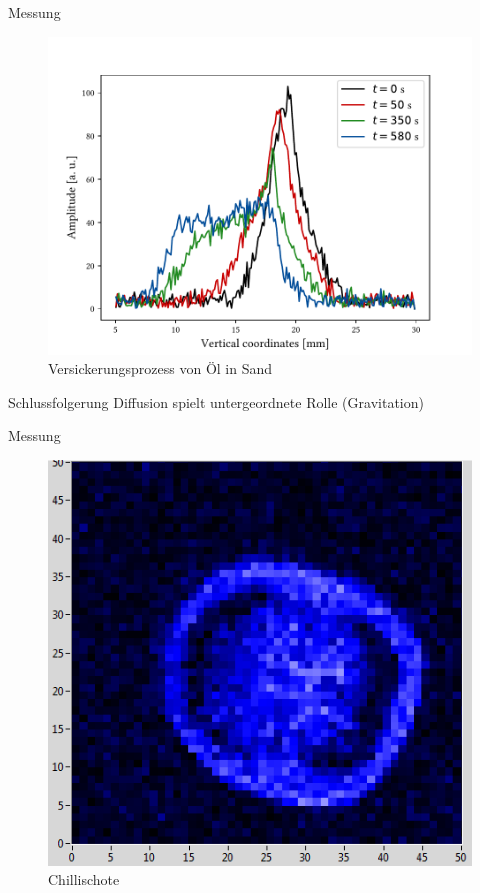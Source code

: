 \begin{frame}{Messung}
	\begin{figure}
	\centering
	\includegraphics[scale=.35]{..//figures//f61_abb_9.pdf}
	\caption{Versickerungsprozess von Öl in Sand}
	\end{figure}
	\begin{block}{Schlussfolgerung}
	Diffusion spielt untergeordnete Rolle (Gravitation)
	\end{block}
\end{frame}

\begin{frame}{Messung}
	\begin{figure}
	\centering
	\includegraphics[scale=.5]{..//figures//chilipepper.png}
	\caption{Chillischote}
	\end{figure}
\end{frame}

